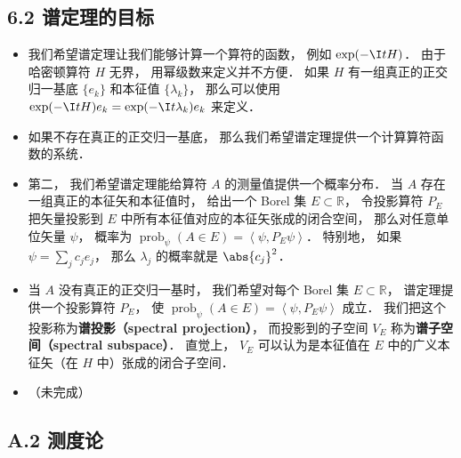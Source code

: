 \subsection{6.2 谱定理的目标}
\begin{itemize}
\item 我们希望谱定理让我们能够计算一个算符的函数， 例如 $\exp(-\I t H)$． 由于哈密顿算符 $H$ 无界， 用幂级数来定义并不方便． 如果 $H$ 有一组真正的正交归一基底 $\{e_k\}$ 和本征值 $\{\lambda_k\}$， 那么可以使用 $\exp(-\I t H)e_k = \exp(-\I t \lambda_k)e_k$ 来定义．

\item 如果不存在真正的正交归一基底， 那么我们希望谱定理提供一个计算算符函数的系统．

\item 第二， 我们希望谱定理能给算符 $A$ 的测量值提供一个概率分布． 当 $A$ 存在一组真正的本征矢和本征值时， 给出一个 Borel 集 $E\subset \mathbb R$， 令投影算符 $P_E$ 把矢量投影到 $E$ 中所有本征值对应的本征矢张成的闭合空间， 那么对任意单位矢量 $\psi$， 概率为 $\operatorname{prob}_{\psi}(A \in E)=\left\langle\psi, P_{E} \psi\right\rangle$． 特别地， 如果 $\psi = \sum_j c_j e_j$， 那么 $\lambda_j$ 的概率就是 $\abs{c_j}^2$．

\item 当 $A$ 没有真正的正交归一基时， 我们希望对每个 Borel 集 $E\subset \mathbb R$， 谱定理提供一个投影算符 $P_E$， 使 $\operatorname{prob}_{\psi}(A \in E)=\left\langle\psi, P_{E} \psi\right\rangle$ 成立． 我们把这个投影称为\textbf{谱投影（spectral projection）}， 而投影到的子空间 $V_E$ 称为\textbf{谱子空间（spectral subspace）}． 直觉上， $V_E$ 可以认为是本征值在 $E$ 中的广义本征矢（在 $H$ 中）张成的闭合子空间．

\item （未完成）
\end{itemize}

\subsection{A.2 测度论}

